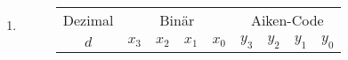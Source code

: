 \documentclass[DIN, pagenumber=false, fontsize=11pt, parskip=half]{scrartcl}
\begin{document}
    \subsection{}
    \begin{enumerate}[label=(\alph*)]
        \item 
            \begin{figure}[H]
                \centering
                \begin{tabular}{c|cccc|cccc}
                    \toprule
                    Dezimal & \multicolumn{4}{c|}{Binär} & \multicolumn{4}{c}{Aiken-Code} \\
                    $d$ & $x_3$ & $x_2$ & $x_1$ & $x_0$ & $y_3$ & $y_2$ & $y_1$ & $y_0$ \\
                    \midrule

                    \bottomrule
                \end{tabular}
            \end{figure}
    \end{enumerate}
\end{document}

